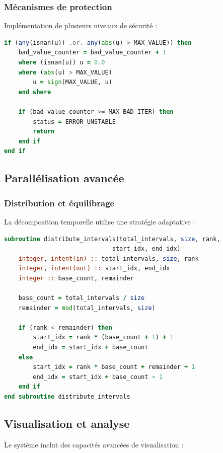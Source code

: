 \subsubsection{Mécanismes de protection}
Implémentation de plusieurs niveaux de sécurité :

\begin{lstlisting}[language=Fortran,caption=Circuit breaker pour les instabilités]
if (any(isnan(u)) .or. any(abs(u) > MAX_VALUE)) then
    bad_value_counter = bad_value_counter + 1
    where (isnan(u)) u = 0.0
    where (abs(u) > MAX_VALUE) 
        u = sign(MAX_VALUE, u)
    end where
    
    if (bad_value_counter >= MAX_BAD_ITER) then
        status = ERROR_UNSTABLE
        return
    end if
end if
\end{lstlisting}

\subsection{Parallélisation avancée}
\subsubsection{Distribution et équilibrage}
La décomposition temporelle utilise une stratégie adaptative :

\begin{lstlisting}[language=Fortran,caption=Distribution des intervalles]
subroutine distribute_intervals(total_intervals, size, rank, 
                              start_idx, end_idx)
    integer, intent(in) :: total_intervals, size, rank
    integer, intent(out) :: start_idx, end_idx
    integer :: base_count, remainder
    
    base_count = total_intervals / size
    remainder = mod(total_intervals, size)
    
    if (rank < remainder) then
        start_idx = rank * (base_count + 1) + 1
        end_idx = start_idx + base_count
    else
        start_idx = rank * base_count + remainder + 1
        end_idx = start_idx + base_count - 1
    end if
end subroutine distribute_intervals
\end{lstlisting}

\subsection{Visualisation et analyse}
Le système inclut des capacités avancées de visualisation :

